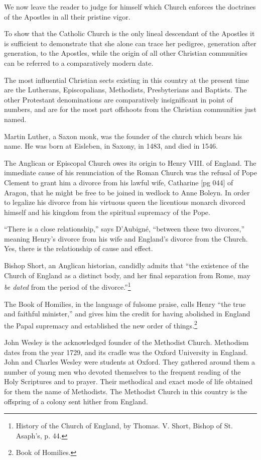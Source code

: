 We now leave the reader to judge for himself
which Church enforces the doctrines of the Apostles
in all their pristine vigor.

To show that the Catholic Church is the only
lineal descendant of the Apostles it is sufficient to
demonstrate that she alone can trace her pedigree,
generation after generation, to the Apostles,
while the origin of all other Christian communities
can be referred to a comparatively modern
date.

The most influential Christian sects existing in
this country at the present time are the Lutherans,
Episcopalians, Methodists, Presbyterians and
Baptists. The other Protestant denominations
are comparatively insignificant in point of numbers,
and are for the most part offshoots from the
Christian communities just named.

Martin Luther, a Saxon monk, was the founder
of the church which bears his name. He was
born at Eisleben, in Saxony, in 1483, and died
in 1546.

The Anglican or Episcopal Church owes its
origin to Henry VIII. of England. The immediate
cause of his renunciation of the Roman
Church was the refusal of Pope Clement to
grant him a divorce from his lawful wife, Catharine
[pg 044]
of Aragon, that he might be free to be joined
in wedlock to Anne Boleyn. In order to legalize
his divorce from his virtuous queen the licentious
monarch divorced himself and his kingdom from
the spiritual supremacy of the Pope.

“There is a close relationship,” says D'Aubigné,
“between these two divorces,” meaning
Henry's divorce from his wife and England's divorce
from the Church. Yes, there is the relationship
of cause and effect.

Bishop Short, an Anglican historian, candidly
admits that “the existence of the Church of England
as a distinct body, and her final separation
from Rome, may \emph{be dated} from the period of the
divorce.”\footnote{History of the Church of
England, by Thomas. V. Short, Bishop of St. Asaph's, p. 44.}

The Book of Homilies, in the language of fulsome
praise, calls Henry “the true and faithful
minister,” and gives him the credit for having
abolished in England the Papal supremacy and
established the new order of things.\footnote{Book of Homilies.}

John Wesley is the acknowledged founder of the
Methodist Church. Methodism dates from the
year 1729, and its cradle was the Oxford University
in England. John and Charles Wesley were
students at Oxford. They gathered around them
a number of young men who devoted themselves
to the frequent reading of the Holy Scriptures
and to prayer. Their methodical and exact mode
of life obtained for them the name of Methodists.
The Methodist Church in this country is the offspring
of a colony sent hither from England.

